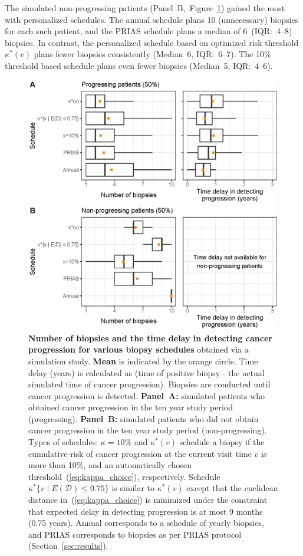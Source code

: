 \documentclass[AMA,STIX1COL]{WileyNJD-v2}
\begin{document}
The simulated non-progressing patients (Panel~B,~Figure~\ref{fig:figure6}) gained the most with personalized schedules. The annual schedule plans 10 (unnecessary) biopsies for each such patient, and the PRIAS schedule plans a median of 6~(IQR:~4--8) biopsies. In contrast, the personalized schedule based on optimized risk threshold $\kappa^*(v)$ plans fewer biopsies consistently (Median~6, IQR:~6--7). The 10\% threshold based schedule plans even fewer biopsies (Median~5, IQR:~4--6).

\begin{figure}[!h]
\centerline{\includegraphics{figure6.eps}}
\caption{\textbf{Number of biopsies and the time delay in detecting cancer progression for various biopsy schedules} obtained via a simulation study. \textbf{Mean} is indicated by the orange circle. Time delay (years) is calculated as (time of positive biopsy - the actual simulated time of cancer progression). Biopsies are conducted until cancer progression is detected. \textbf{Panel~A:} simulated patients who obtained cancer progression in the ten year study period (progressing). \textbf{Panel~B:} simulated patients who did not obtain cancer progression in the ten year study period (non-progressing). Types of schedules: ${\kappa=10\%}$ and $\kappa^*(v)$ schedule a biopsy if the cumulative-risk of cancer progression at the current visit time $v$ is more than 10\%, and an automatically chosen threshold~(\ref{eq:kappa_choice}), respectively. Schedule ${\kappa^*\{v \mid E(\mathcal{D})\leq 0.75\}}$ is similar to $\kappa^*(v)$ except that the euclidean distance in~(\ref{eq:kappa_choice}) is minimized under the constraint that expected delay in detecting progression is at most 9 months (0.75 years). Annual corresponds to a schedule of yearly biopsies, and PRIAS corresponds to biopsies as per PRIAS protocol (Section~\ref{sec:results}).}
\label{fig:figure6}
\end{figure}
\end{document}
